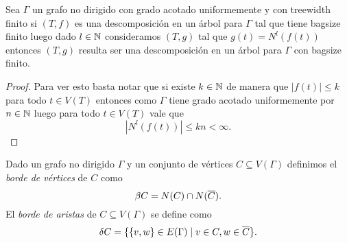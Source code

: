 \documentclass[tesis.tex]{subfiles}
\begin{document}
\begin{coro}\label{coro_vecinos_bagsize_grado}
	Sea $\Gamma$ un grafo no dirigido con grado acotado uniformemente y con treewidth finito si $(T,f)$ es una descomposición en un árbol para $\Gamma$ tal que tiene bagsize finito luego dado $l \in \mathbb{N}$ consideramos $(T,g)$ tal que $g(t) = N^l(f(t))$ entonces $(T,g)$ resulta ser una descomposición en un árbol para $\Gamma$ con bagsize finito.
\end{coro}
\begin{proof}
	Para ver esto basta notar que si existe $k \in \mathbb{N}$ de manera que  $|f(t)| \le k$ para todo $t \in V(T)$ entonces como $\Gamma$ tiene grado acotado uniformemente por $n \in \mathbb{N}$ luego para todo $t \in V(T)$ vale que
	\[
		|N^{l} (f(t))| \le kn < \infty.
	\]
	
\end{proof}

\begin{deff}
	Dado un grafo no dirigido $\Gamma$ y un conjunto de vértices $C \subseteq V(\Gamma)$ definimos el \emph{borde de vértices} de $C$ como
	\[
	\beta C =  N(C) \cap N(\overline{ C}).
	\] 
	El \emph{borde de aristas} de $C \subseteq V(\Gamma)$ se define como
	\[
	\delta C = \{  \{v,w \} \in E(\Gamma) \mid v \in C, w \in \overline C    \}.
	\]
\end{deff}
\end{document}
